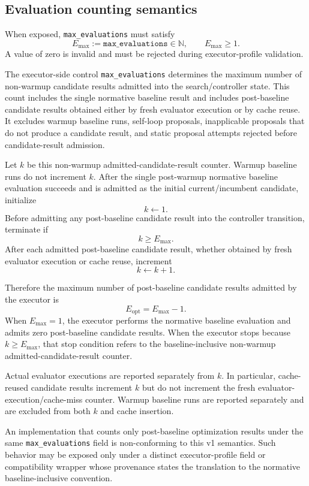 \documentclass[11pt]{article}
\begin{document}
\subsection{Evaluation counting semantics}

When exposed, \texttt{max\_evaluations} must satisfy
\[
E_{\max}:=\texttt{max\_evaluations}\in\mathbb{N},\qquad E_{\max}\ge 1.
\]
A value of zero is invalid and must be rejected during executor-profile
validation.

The executor-side control \texttt{max\_evaluations} determines the maximum
number of non-warmup candidate results admitted into the search/controller
state. This count includes the single normative baseline result and includes
post-baseline candidate results obtained either by fresh evaluator execution or
by cache reuse. It excludes warmup baseline runs, self-loop proposals,
inapplicable proposals that do not produce a candidate result, and static
proposal attempts rejected before candidate-result admission.

Let $k$ be this non-warmup admitted-candidate-result counter. Warmup baseline
runs do not increment $k$. After the single post-warmup normative baseline
evaluation succeeds and is admitted as the initial current/incumbent candidate,
initialize
\[
k\leftarrow 1.
\]
Before admitting any post-baseline candidate result into the controller
transition, terminate if
\[
k\ge E_{\max}.
\]
After each admitted post-baseline candidate result, whether obtained by fresh
evaluator execution or cache reuse, increment
\[
k\leftarrow k+1.
\]

Therefore the maximum number of post-baseline candidate results admitted by the
executor is
\[
E_{\mathrm{opt}}=E_{\max}-1.
\]
When $E_{\max}=1$, the executor performs the normative baseline evaluation and
admits zero post-baseline candidate results. When the executor stops because
$k\ge E_{\max}$, that stop condition refers to the baseline-inclusive
non-warmup admitted-candidate-result counter.

Actual evaluator executions are reported separately from $k$. In particular,
cache-reused candidate results increment $k$ but do not increment the fresh
evaluator-execution/cache-miss counter. Warmup baseline runs are reported
separately and are excluded from both $k$ and cache insertion.

An implementation that counts only post-baseline optimization results under
the same \texttt{max\_evaluations} field is non-conforming to this v1
semantics. Such behavior may be exposed only under a distinct executor-profile
field or compatibility wrapper whose provenance states the translation to the
normative baseline-inclusive convention.
\end{document}
